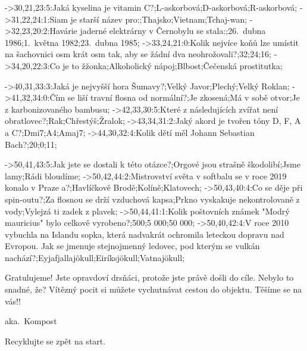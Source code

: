 ->30,21,23:5:Jaká kyselina je vitamin C?;L-askorbová;D-askorbová;R-askorbová;%
->31,22,24:1:Siam je starší název pro:;Thajsko;Vietnam;Tchaj-wan;%
->32,23,20:2:Havárie jaderné elektrárny v Černoby\-lu se stala:;26.\ dubna 1986;1.\ května 1982;23.\ dubna 1985;%
->33,24,21:0:Kolik nejvíce koňů lze umístit na ša\-cho\-vni\-ci osm krát osm tak, aby se žád\-ní dva neohrožovali?;32;24;16;%
->34,20,22:3:Co je to žžonka;Alkoholický nápoj;Blbost;Čečenská prostitutka;%

->40,31,33:3:Jaká je nejvyšší hora Šumavy?;Velký Javor;Plechý;Velký Roklan;%
->41,32,34:0:Čím se liší travní flosna od normální?;Je zkosená;Má v sobě otvor;Je z karbonizovaného bambusu;%
->42,33,30:5:Které z následujících zvířat není o\-brat\-lo\-vec?;Rak;Chřestýš;Žralok;%
->43,34,31:2:Jaký akord je tvořen tóny D, F, A a C?;Dmi7;A4;Amaj7;%
->44,30,32:4:Kolik dětí měl Johann Sebastian Bach?;20;0;11;%

->50,41,43:5:Jak jste se dostali k této otázce?;Orgové jsou strašně škodolibí;Jsme lamy;Rádi bloudíme;%
->50,42,44:2:Mistrovství světa v softbalu se v roce 2019 konalo v Praze a?;Havlíčkově Brodě;Kolíně;Klatovech;%
->50,43,40:4:Co se děje při spin-outu?;Za flosnou se drží vzduchová kapsa;Prkno vyskakuje nekontrolovaně z vody;Vylejzá ti zadek z plavek;%
->50,44,41:1:Kolik poštovních známek "Modrý mauricius" bylo celkově vyrobeno?;500;5 000;50 000;%
->50,40,42:4:V roce 2010 vybuchla na Islandu sopka, která nadvakrát ochromila leteckou dopravu nad Evropou. Jak se jmenuje stej\-nojmenný ledovec, pod kterým se vul\-kán nachází?;Eyjafjallajökull;Eiríksjökull;Vatnajökull;%
%


%
%
\centerline{\topletterfont{}}
\vskip2cm
\baselineskip=55pt
{\finishfont\hskip1.8cm Gratulujeme! Jste opravdoví drs\-ňá\-ci, protože jste právě došli do cíle. Nebylo to snadné, že? Ví\-těz\-ný pocit si můžete vychutnávat cestou do objektu. Těšíme se na vás!!}
\footing


%
%
\centerline{\topletterfont{}}
\vskip2cm
\centerline{\kompostfont aka.\ Kompost}
\vskip2cm
\baselineskip=55pt
\centerline{\finishfont Recyklujte se zpět na start.}
\footing


%
%
\bye
